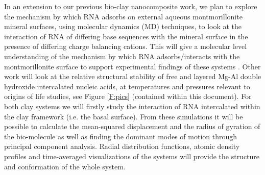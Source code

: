 In an extension to our previous bio-clay nanocomposite work, we plan to explore the mechanism by which RNA adsorbs on external aqueous montmorillonite mineral surfaces, using molecular dynamics (MD) techniques, to look at the interaction of RNA of differing base sequences with the mineral surface in the presence of differing charge balancing cations. This will give a molecular level understanding of the mechanism by which RNA adsorbs/interacts with the montmorillonite surface to support experimental findings of these systems \cite{Franchi, Huang}. Other work will look at the relative structural stability of free and layered Mg-Al double hydroxide intercalated nucleic acids, at temperatures and pressures relevant to origins of life studies, see Figure \ref{F:pics} (contained within this document). For both clay systems we will firstly study the interaction of RNA intercalated within the clay framework (i.e. the basal surface).  From these simulations it will be possible to calculate the mean-squared displacement and the radius of gyration of the bio-molecule as well as finding the dominant modes of motion through principal component analysis. Radial distribution functions, atomic density profiles and time-averaged visualizations of the systems will provide the structure and conformation of the whole system.
 
